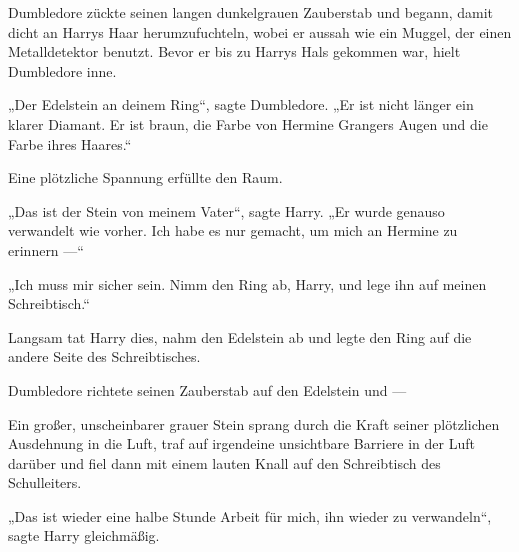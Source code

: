 Dumbledore zückte seinen langen dunkelgrauen Zauberstab und begann, damit dicht an Harrys Haar herumzufuchteln, wobei er aussah wie ein Muggel, der einen Metalldetektor benutzt. Bevor er bis zu Harrys Hals gekommen war, hielt Dumbledore inne.

„Der Edelstein an deinem Ring“, sagte Dumbledore.
„Er ist nicht länger ein klarer Diamant. Er ist braun, die Farbe von Hermine Grangers Augen und die Farbe ihres Haares.“

Eine plötzliche Spannung erfüllte den Raum.

„Das ist der Stein von meinem Vater“, sagte Harry.
„Er wurde genauso verwandelt wie vorher. Ich habe es nur gemacht, um mich an Hermine zu erinnern —“

„Ich muss mir sicher sein. Nimm den Ring ab, Harry, und lege ihn auf meinen Schreibtisch.“

Langsam tat Harry dies, nahm den Edelstein ab und legte den Ring auf die andere Seite des Schreibtisches.

Dumbledore richtete seinen Zauberstab auf den Edelstein und —

Ein großer, unscheinbarer grauer Stein sprang durch die Kraft seiner plötzlichen Ausdehnung in die Luft, traf auf irgendeine unsichtbare Barriere in der Luft darüber und fiel dann mit einem lauten Knall auf den Schreibtisch des Schulleiters.

„Das ist wieder eine halbe Stunde Arbeit für mich, ihn wieder zu verwandeln“, sagte Harry gleichmäßig.

